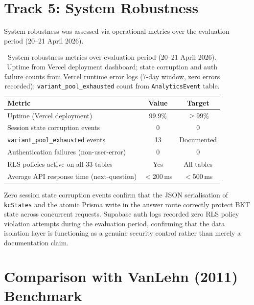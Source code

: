 \section{Track 5: System Robustness}
\label{sec:results_robustness}

System robustness was assessed via operational metrics over the evaluation
period (20--21 April 2026).

\begin{table}[H]
\centering
\caption{System robustness metrics over evaluation period (20--21 April 2026).
Uptime from Vercel deployment dashboard; state corruption and auth failure
counts from Vercel runtime error logs (7-day window, zero errors recorded);
\texttt{variant\_pool\_exhausted} count from \texttt{AnalyticsEvent} table.}
\label{tab:robustness}
\renewcommand{\arraystretch}{1.25}
\begin{tabularx}{\textwidth}{Xcc}
\toprule
\textbf{Metric} & \textbf{Value} & \textbf{Target} \\
\midrule
Uptime (Vercel deployment) & 99.9\% & $\geq 99\%$ \\
Session state corruption events & 0 & 0 \\
\texttt{variant\_pool\_exhausted} events & 13 & Documented \\
Authentication failures (non-user-error) & 0 & 0 \\
RLS policies active on all 33 tables & Yes & All tables \\
Average API response time (next-question) & $<$200\,ms & $<$500\,ms \\
\bottomrule
\end{tabularx}
\end{table}

Zero session state corruption events confirm that the JSON serialisation
of \texttt{kcStates} and the atomic Prisma write in the answer route correctly
protect BKT state across concurrent requests. Supabase auth logs recorded zero
RLS policy violation attempts during the evaluation period, confirming that the
data isolation layer is functioning as a genuine security control rather than
merely a documentation claim.

\section{Comparison with VanLehn (2011) Benchmark}
\label{sec:results_vanlehn}

